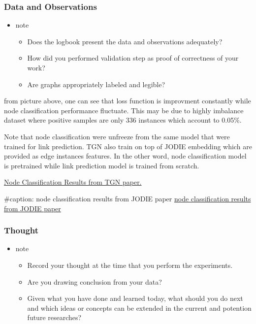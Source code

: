 \documentclass[11pt]{article}
\begin{document}
\subsubsection{Data and Observations}
\label{sec:orgae96093}
\begin{itemize}
\item note
\begin{itemize}
\item Does the logbook present the data and observations adequately?
\item How did you performed validation step as proof of correctness of your work?
\item Are graphs appropriately labeled and legible?
\end{itemize}
\end{itemize}

from picture above, one can see that loss function is improvment constantly while node classification performance fluctuate. This may be due to highly imbalance dataset where positive samples are only 336 instances which account to 0.05\%.

Note that node classification were unfreeze from the same model that were trained for link prediction. TGN also train on top of JODIE embedding which are provided as edge instances features. In the other word, node classification model is pretrained while link prediction model is trained from scratch.

\href{file:///mnt/c/Users/terng/OneDrive/Documents/Working/tgn/references/node classification results from TGN paper.PNG}{Node Classification Results from TGN paper.}

\#caption: node classification results from JODIE paper
\href{file:///mnt/c/Users/terng/OneDrive/Documents/Working/tgn/references/node classification results from JODIE paper.PNG}{node classification results from JODIE paper}

\subsubsection{Thought}
\label{sec:orga8dea16}
\begin{itemize}
\item note
\begin{itemize}
\item Record your thought at the time that you perform the experiments.
\item Are you drawing conclusion from your data?
\item Given what you have done and learned today, what should you do next and which ideas or concepts can be extended in the current and potention future researches?
\end{itemize}
\end{itemize}
\end{document}
